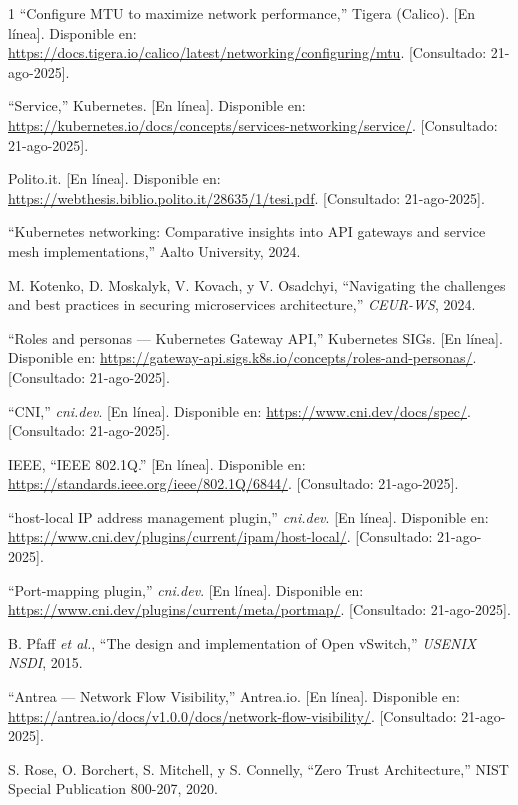\begin{thebibliography}{1}
``Configure MTU to maximize network performance,'' Tigera (Calico). [En línea]. Disponible en: \url{https://docs.tigera.io/calico/latest/networking/configuring/mtu}. [Consultado: 21-ago-2025].

``Service,'' Kubernetes. [En línea]. Disponible en: \url{https://kubernetes.io/docs/concepts/services-networking/service/}. [Consultado: 21-ago-2025].

Polito.it. [En línea]. Disponible en: \url{https://webthesis.biblio.polito.it/28635/1/tesi.pdf}. [Consultado: 21-ago-2025].

``Kubernetes networking: Comparative insights into API gateways and service mesh implementations,'' Aalto University, 2024.

M. Kotenko, D. Moskalyk, V. Kovach, y V. Osadchyi, ``Navigating the challenges and best practices in securing microservices architecture,'' \emph{CEUR-WS}, 2024.

``Roles and personas --- Kubernetes Gateway API,'' Kubernetes SIGs. [En línea]. Disponible en: \url{https://gateway-api.sigs.k8s.io/concepts/roles-and-personas/}. [Consultado: 21-ago-2025].

``CNI,'' \emph{cni.dev}. [En línea]. Disponible en: \url{https://www.cni.dev/docs/spec/}. [Consultado: 21-ago-2025].

IEEE, ``IEEE 802.1Q.'' [En línea]. Disponible en: \url{https://standards.ieee.org/ieee/802.1Q/6844/}. [Consultado: 21-ago-2025].

``host-local IP address management plugin,'' \emph{cni.dev}. [En línea]. Disponible en: \url{https://www.cni.dev/plugins/current/ipam/host-local/}. [Consultado: 21-ago-2025].

``Port-mapping plugin,'' \emph{cni.dev}. [En línea]. Disponible en: \url{https://www.cni.dev/plugins/current/meta/portmap/}. [Consultado: 21-ago-2025].

B. Pfaff \emph{et al.}, ``The design and implementation of Open vSwitch,'' \emph{USENIX NSDI}, 2015.

``Antrea --- Network Flow Visibility,'' Antrea.io. [En línea]. Disponible en: \url{https://antrea.io/docs/v1.0.0/docs/network-flow-visibility/}. [Consultado: 21-ago-2025].

S. Rose, O. Borchert, S. Mitchell, y S. Connelly, ``Zero Trust Architecture,'' NIST Special Publication 800-207, 2020.


\end{thebibliography}
